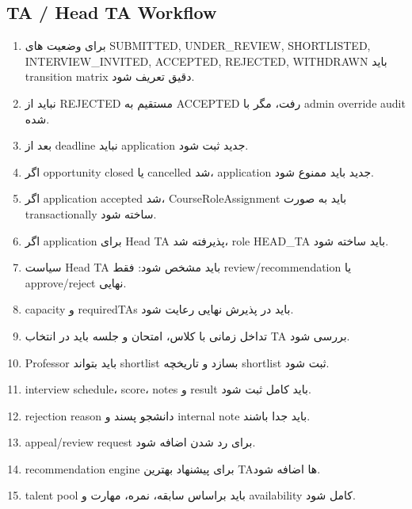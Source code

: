 \documentclass[11pt,a4paper]{article}
\begin{document}
\subsection{TA / Head TA Workflow}
\begin{enumerate}[label=\arabic*. ,resume]
\item برای وضعیت های SUBMITTED, UNDER\_REVIEW, SHORTLISTED, INTERVIEW\_INVITED, ACCEPTED, REJECTED, WITHDRAWN باید transition matrix دقیق تعریف شود.
\item نباید از REJECTED مستقیم به ACCEPTED رفت، مگر با admin override audit شده.
\item بعد از deadline نباید application جدید ثبت شود.
\item اگر opportunity closed یا cancelled شد، application جدید باید ممنوع شود.
\item اگر application accepted شد، CourseRoleAssignment باید به صورت transactionally ساخته شود.
\item اگر application برای Head TA پذیرفته شد، role HEAD\_TA باید ساخته شود.
\item سیاست Head TA باید مشخص شود: فقط review/recommendation یا approve/reject نهایی.
\item capacity و requiredTAs باید در پذیرش نهایی رعایت شود.
\item تداخل زمانی با کلاس، امتحان و جلسه باید در انتخاب TA بررسی شود.
\item Professor باید بتواند shortlist بسازد و تاریخچه shortlist ثبت شود.
\item interview schedule، score، notes و result باید کامل ثبت شود.
\item rejection reason دانشجو پسند و internal note باید جدا باشند.
\item appeal/review request برای رد شدن اضافه شود.
\item recommendation engine برای پیشنهاد بهترین TAها اضافه شود.
\item talent pool باید براساس سابقه، نمره، مهارت و availability کامل شود.
\end{enumerate}
\end{document}
